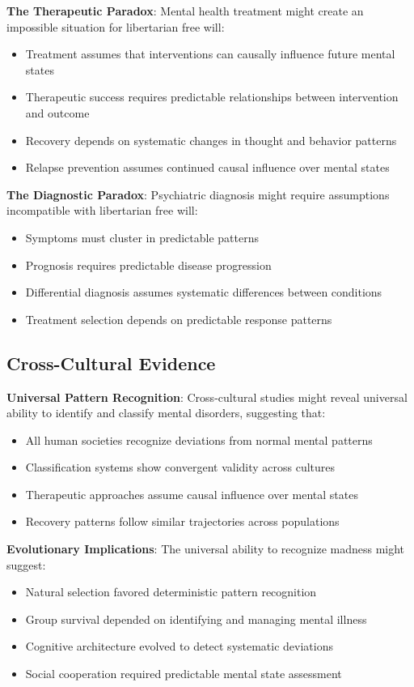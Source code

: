 \documentclass[12pt]{article}
\begin{document}
\textbf{The Therapeutic Paradox}: Mental health treatment might create an impossible situation for libertarian free will:
\begin{itemize}
\item Treatment assumes that interventions can causally influence future mental states
\item Therapeutic success requires predictable relationships between intervention and outcome
\item Recovery depends on systematic changes in thought and behavior patterns
\item Relapse prevention assumes continued causal influence over mental states
\end{itemize}

\textbf{The Diagnostic Paradox}: Psychiatric diagnosis might require assumptions incompatible with libertarian free will:
\begin{itemize}
\item Symptoms must cluster in predictable patterns
\item Prognosis requires predictable disease progression
\item Differential diagnosis assumes systematic differences between conditions
\item Treatment selection depends on predictable response patterns
\end{itemize}

\subsection{Cross-Cultural Evidence}

\textbf{Universal Pattern Recognition}: Cross-cultural studies might reveal universal ability to identify and classify mental disorders, suggesting that:
\begin{itemize}
\item All human societies recognize deviations from normal mental patterns
\item Classification systems show convergent validity across cultures
\item Therapeutic approaches assume causal influence over mental states
\item Recovery patterns follow similar trajectories across populations
\end{itemize}

\textbf{Evolutionary Implications}: The universal ability to recognize madness might suggest:
\begin{itemize}
\item Natural selection favored deterministic pattern recognition
\item Group survival depended on identifying and managing mental illness
\item Cognitive architecture evolved to detect systematic deviations
\item Social cooperation required predictable mental state assessment
\end{itemize}
\end{document}
